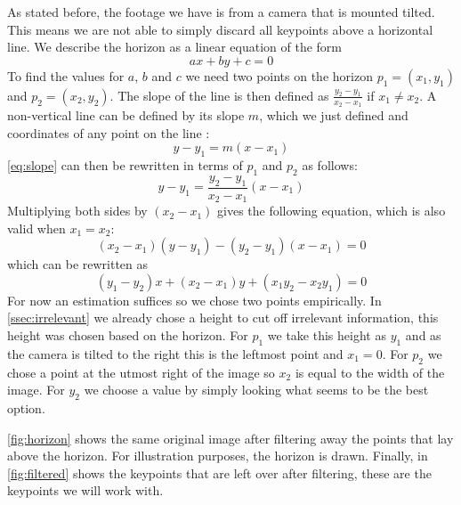 As stated before, the footage we have is from a camera that is mounted tilted. This means we are not able to simply discard all keypoints above a horizontal line. We describe the horizon as a linear equation of the form
\begin{equation}\label{eq:linear}
    ax + by + c = 0
\end{equation}
To find the values for $a$, $b$ and $c$ we need two points on the horizon $p_1 = (x_1, y_1)$ and $ p_2 = (x_2, y_2)$. The slope of the line is then defined as $\frac{y_2-y_1}{x_2-x_1}$ if $x_1 \neq x_2$. A non-vertical line can be defined by its slope $m$, which we just defined and coordinates of any point on the line \cite{wiki_linear}:
\begin{equation}\label{eq:slope}
    y - y_1 = m(x-x_1)
\end{equation}
\autoref{eq:slope} can then be rewritten in terms of $p_1$ and $p_2$ as follows:
\begin{equation}
    y - y_1 = \frac{y_2-y_1}{x_2-x_1}(x-x_1)
\end{equation}
Multiplying both sides by $(x_2-x_1)$ gives the following equation, which is also valid when $x_1 = x_2$:
\begin{equation}
    (x_2-x_1)(y-y_1) - (y_2-y_1)(x-x_1) = 0
\end{equation}
which can be rewritten as
\begin{equation}
    (y_1-y_2)x + (x_2-x_1)y + (x_1y_2-x_2y_1) = 0
\end{equation}
For now an estimation suffices so we chose two points empirically. In \autoref{ssec:irrelevant} we already chose a height to cut off irrelevant information, this height was chosen based on the horizon. For $p_1$ we take this height as $y_1$ and as the camera is tilted to the right this is the leftmost point and $x_1 = 0$. For $p_2$ we chose a point at the utmost right of the image so $x_2$ is equal to the width of the image. For $y_2$ we choose a value by simply looking what seems to be the best option. \bigskip

\autoref{fig:horizon} shows the same original image after filtering away the points that lay above the horizon. For illustration purposes, the horizon is drawn. Finally, in \autoref{fig:filtered} shows the keypoints that are left over after filtering, these are the keypoints we will work with.\bigskip

